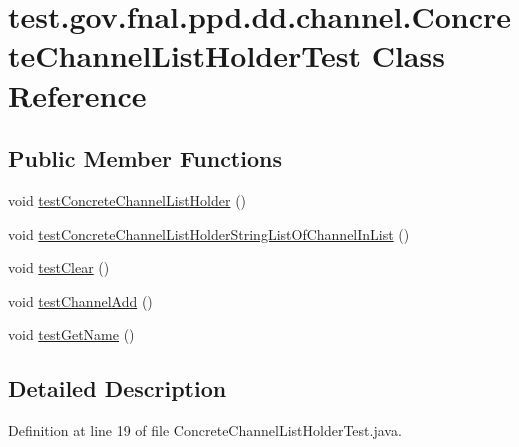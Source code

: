 \hypertarget{classtest_1_1gov_1_1fnal_1_1ppd_1_1dd_1_1channel_1_1ConcreteChannelListHolderTest}{\section{test.\-gov.\-fnal.\-ppd.\-dd.\-channel.\-Concrete\-Channel\-List\-Holder\-Test Class Reference}
\label{classtest_1_1gov_1_1fnal_1_1ppd_1_1dd_1_1channel_1_1ConcreteChannelListHolderTest}
}
\subsection*{Public Member Functions}
\begin{DoxyCompactItemize}
\item 
void \hyperlink{classtest_1_1gov_1_1fnal_1_1ppd_1_1dd_1_1channel_1_1ConcreteChannelListHolderTest_a18061e5d2be01d5d9e5d6c0236c2110c}{test\-Concrete\-Channel\-List\-Holder} ()
\item 
void \hyperlink{classtest_1_1gov_1_1fnal_1_1ppd_1_1dd_1_1channel_1_1ConcreteChannelListHolderTest_aab0ce5c132b4138233bf5bc98fc0f884}{test\-Concrete\-Channel\-List\-Holder\-String\-List\-Of\-Channel\-In\-List} ()
\item 
void \hyperlink{classtest_1_1gov_1_1fnal_1_1ppd_1_1dd_1_1channel_1_1ConcreteChannelListHolderTest_a3b0a1f86dcd65fc962a06a2c788ef872}{test\-Clear} ()
\item 
void \hyperlink{classtest_1_1gov_1_1fnal_1_1ppd_1_1dd_1_1channel_1_1ConcreteChannelListHolderTest_a187c2eb4012ac72a2e2ba0196a33cfac}{test\-Channel\-Add} ()
\item 
void \hyperlink{classtest_1_1gov_1_1fnal_1_1ppd_1_1dd_1_1channel_1_1ConcreteChannelListHolderTest_a5a2bdc4009cefa078dd325b6a6cb31eb}{test\-Get\-Name} ()
\end{DoxyCompactItemize}


\subsection{Detailed Description}


Definition at line 19 of file Concrete\-Channel\-List\-Holder\-Test.\-java.



